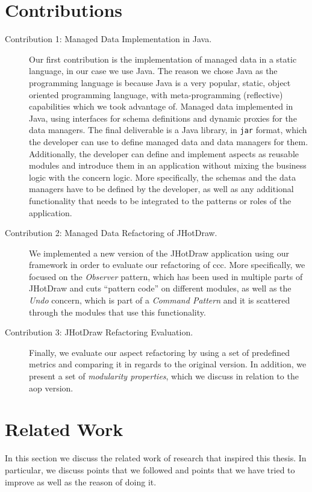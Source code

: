 \section{Contributions}\label{Contributions}

\begin{description}
  \item[Contribution 1: Managed Data Implementation in Java.]
  Our first contribution is the implementation of managed data in a static language, in our case we use Java.
  The reason we chose Java as the programming language is because Java is a very popular, static, object oriented programming language, with meta-programming (reflective) capabilities which we took advantage of.
  Managed data implemented in Java, using interfaces for schema definitions and dynamic proxies for the data managers.
  The final deliverable is a Java library, in \texttt{jar} format, which the developer can use to define managed data and data managers for them. 
  Additionally, the developer can define and implement aspects as reusable modules and introduce them in an application without mixing the business logic with the concern logic. 
  More specifically, the schemas and the data managers have to be defined by the developer, as well as any additional functionality that needs to be integrated to the patterns or roles of the application.

  \item[Contribution 2: Managed Data Refactoring of JHotDraw.]
  We implemented a new version of the JHotDraw application using our framework in order to evaluate our refactoring of \ac{ccc}.
  More specifically, we focused on the \textit{Observer} pattern, which has been used in multiple parts of JHotDraw and cuts ``pattern code'' on different modules, as well as the \textit{Undo} concern, which is part of a \textit{Command Pattern} and it is scattered through the modules that use this functionality.

  \item[Contribution 3: JHotDraw Refactoring Evaluation.]
  Finally, we evaluate our aspect refactoring by using a set of predefined metrics and comparing it in regards to the original version.
  In addition, we present a set of \textit{modularity properties}, which we discuss in relation to the \ac{aop} version.
\end{description}

\section{Related Work}\label{Related Work}
In this section we discuss the related work of research that inspired this thesis.
In particular, we discuss points that we followed and points that we have tried to improve as well as the reason of doing it.

